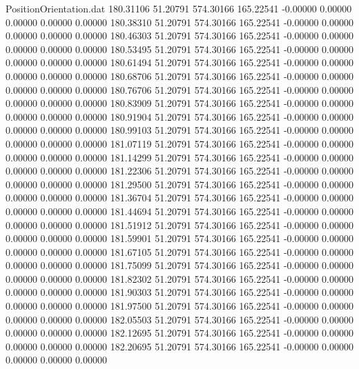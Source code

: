 \begin{filecontents}{PositionOrientation.dat}
 180.31106   51.20791  574.30166   165.22541   -0.00000    0.00000    0.00000    0.00000    0.00000
 180.38310   51.20791  574.30166   165.22541   -0.00000    0.00000    0.00000    0.00000    0.00000
 180.46303   51.20791  574.30166   165.22541   -0.00000    0.00000    0.00000    0.00000    0.00000
 180.53495   51.20791  574.30166   165.22541   -0.00000    0.00000    0.00000    0.00000    0.00000
 180.61494   51.20791  574.30166   165.22541   -0.00000    0.00000    0.00000    0.00000    0.00000
 180.68706   51.20791  574.30166   165.22541   -0.00000    0.00000    0.00000    0.00000    0.00000
 180.76706   51.20791  574.30166   165.22541   -0.00000    0.00000    0.00000    0.00000    0.00000
 180.83909   51.20791  574.30166   165.22541   -0.00000    0.00000    0.00000    0.00000    0.00000
 180.91904   51.20791  574.30166   165.22541   -0.00000    0.00000    0.00000    0.00000    0.00000
 180.99103   51.20791  574.30166   165.22541   -0.00000    0.00000    0.00000    0.00000    0.00000
 181.07119   51.20791  574.30166   165.22541   -0.00000    0.00000    0.00000    0.00000    0.00000
 181.14299   51.20791  574.30166   165.22541   -0.00000    0.00000    0.00000    0.00000    0.00000
 181.22306   51.20791  574.30166   165.22541   -0.00000    0.00000    0.00000    0.00000    0.00000
 181.29500   51.20791  574.30166   165.22541   -0.00000    0.00000    0.00000    0.00000    0.00000
 181.36704   51.20791  574.30166   165.22541   -0.00000    0.00000    0.00000    0.00000    0.00000
 181.44694   51.20791  574.30166   165.22541   -0.00000    0.00000    0.00000    0.00000    0.00000
 181.51912   51.20791  574.30166   165.22541   -0.00000    0.00000    0.00000    0.00000    0.00000
 181.59901   51.20791  574.30166   165.22541   -0.00000    0.00000    0.00000    0.00000    0.00000
 181.67105   51.20791  574.30166   165.22541   -0.00000    0.00000    0.00000    0.00000    0.00000
 181.75099   51.20791  574.30166   165.22541   -0.00000    0.00000    0.00000    0.00000    0.00000
 181.82302   51.20791  574.30166   165.22541   -0.00000    0.00000    0.00000    0.00000    0.00000
 181.90303   51.20791  574.30166   165.22541   -0.00000    0.00000    0.00000    0.00000    0.00000
 181.97500   51.20791  574.30166   165.22541   -0.00000    0.00000    0.00000    0.00000    0.00000
 182.05503   51.20791  574.30166   165.22541   -0.00000    0.00000    0.00000    0.00000    0.00000
 182.12695   51.20791  574.30166   165.22541   -0.00000    0.00000    0.00000    0.00000    0.00000
 182.20695   51.20791  574.30166   165.22541   -0.00000    0.00000    0.00000    0.00000    0.00000

\end{filecontents}
